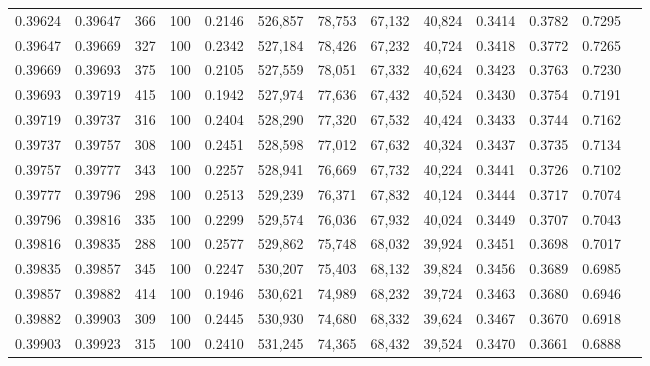 \begin{tabular}{rrrrrrrrrrrrr}
0.39624 & 0.39647 &   366 & 100 &                                     0.2146 & 526,857 &  78,753 &  67,132 &  40,824 & 0.3414 & 0.3782 & 0.7295 \\
0.39647 & 0.39669 &   327 & 100 &                                     0.2342 & 527,184 &  78,426 &  67,232 &  40,724 & 0.3418 & 0.3772 & 0.7265 \\
0.39669 & 0.39693 &   375 & 100 &                                     0.2105 & 527,559 &  78,051 &  67,332 &  40,624 & 0.3423 & 0.3763 & 0.7230 \\
0.39693 & 0.39719 &   415 & 100 &                                     0.1942 & 527,974 &  77,636 &  67,432 &  40,524 & 0.3430 & 0.3754 & 0.7191 \\
0.39719 & 0.39737 &   316 & 100 &                                     0.2404 & 528,290 &  77,320 &  67,532 &  40,424 & 0.3433 & 0.3744 & 0.7162 \\
0.39737 & 0.39757 &   308 & 100 &                                     0.2451 & 528,598 &  77,012 &  67,632 &  40,324 & 0.3437 & 0.3735 & 0.7134 \\
0.39757 & 0.39777 &   343 & 100 &                                     0.2257 & 528,941 &  76,669 &  67,732 &  40,224 & 0.3441 & 0.3726 & 0.7102 \\
0.39777 & 0.39796 &   298 & 100 &                                     0.2513 & 529,239 &  76,371 &  67,832 &  40,124 & 0.3444 & 0.3717 & 0.7074 \\
0.39796 & 0.39816 &   335 & 100 &                                     0.2299 & 529,574 &  76,036 &  67,932 &  40,024 & 0.3449 & 0.3707 & 0.7043 \\
0.39816 & 0.39835 &   288 & 100 &                                     0.2577 & 529,862 &  75,748 &  68,032 &  39,924 & 0.3451 & 0.3698 & 0.7017 \\
0.39835 & 0.39857 &   345 & 100 &                                     0.2247 & 530,207 &  75,403 &  68,132 &  39,824 & 0.3456 & 0.3689 & 0.6985 \\
0.39857 & 0.39882 &   414 & 100 &                                     0.1946 & 530,621 &  74,989 &  68,232 &  39,724 & 0.3463 & 0.3680 & 0.6946 \\
0.39882 & 0.39903 &   309 & 100 &                                     0.2445 & 530,930 &  74,680 &  68,332 &  39,624 & 0.3467 & 0.3670 & 0.6918 \\
0.39903 & 0.39923 &   315 & 100 &                                     0.2410 & 531,245 &  74,365 &  68,432 &  39,524 & 0.3470 & 0.3661 & 0.6888 \\

\end{tabular}
